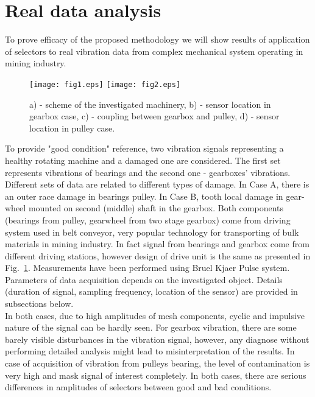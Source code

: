 \documentclass[3p,times]{elsarticle}
\begin{document}
\section{Real data analysis}\label{real}
To prove efficacy of the proposed methodology we will show results of application of selectors to real vibration data from complex mechanical system operating in mining industry.
\begin{figure}[!ht]
\begin{center}
\texttt{[image: fig1.eps]}
\texttt{[image: fig2.eps]}
\caption{a) - scheme of the investigated machinery, b) - sensor location in gearbox case, c) - coupling between gearbox and pulley, d) - sensor location in pulley case.}\label{machine}
\end{center}
\end{figure}
To provide "good condition" reference, two vibration signals representing a healthy rotating machine and a damaged one are considered. The first set represents vibrations of bearings and the second one - gearboxes' vibrations. Different sets of data are related to different types of damage. In Case A, there is an outer race damage in bearings pulley. In Case B, tooth local damage in gear-wheel mounted on second (middle) shaft in the  gearbox. Both components (bearings from pulley, gearwheel from two stage gearbox) come from driving system used in belt conveyor, very popular technology for transporting  of bulk materials in mining industry. In fact signal from bearings and gearbox come from different driving stations, however design of drive unit is the same as presented in Fig.~\ref{machine}. Measurements have been performed using Bruel Kjaer Pulse system. Parameters of data acquisition depends on the investigated object. Details (duration of signal, sampling frequency, location of the sensor) are provided in subsections below.\\
In both cases, due to high amplitudes of mesh components, cyclic and impulsive nature of the signal can be hardly seen. For gearbox vibration, there are some barely visible disturbances in the vibration signal, however, any diagnose without performing detailed analysis might lead to misinterpretation of the results. In case of acquisition of vibration from pulleys bearing, the level of contamination is very high and mask signal of interest completely. In both cases, there are serious differences in amplitudes of selectors between good and bad conditions.
\end{document}
